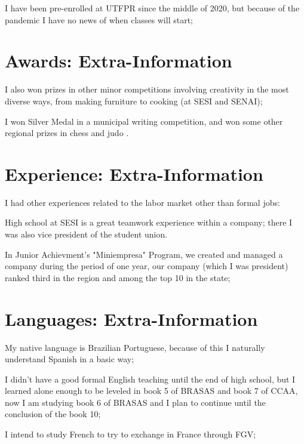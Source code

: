 \documentclass[letterpaper]{twentysecondcv} %
\begin{document}
I have been pre-enrolled at UTFPR since the middle of 2020, but because of the pandemic I have no news of when classes will start;

\section{Awards: Extra-Information}

I also won prizes in other minor competitions involving creativity in the most diverse ways, from making furniture to cooking (at SESI and SENAI);

I won Silver Medal in a municipal writing competition, and won some other regional prizes in chess and judo .

\section{Experience: Extra-Information}

I had other experiences related to the labor market other than formal jobs:

High school at SESI is a great teamwork experience within a company; there I was also vice president of the student union.

In Junior Achievment's "Miniempresa" Program, we created and managed a company during the period of one year, our company (which I was president) ranked third in the region and among the top 10 in the state;

\section{Languages: Extra-Information}

My native language is Brazilian Portuguese, because of this I naturally understand Spanish in a basic way;

I didn’t have a good formal English teaching until the end of high school, but I learned alone enough to be leveled in book 5 of BRASAS and book 7 of CCAA, now I am studying book 6 of BRASAS and I plan to continue until the conclusion of the book 10;

I intend to study French to try to exchange in France through FGV;

\end{document}
